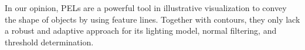 \documentclass[9pt,fleqn,twoside,twocolumn]{stdglobal}
\begin{document}
  In our opinion, PELs are a powerful tool in illustrative visualization to convey the shape of objects by using feature lines.
  Together with contours, they only lack a robust and adaptive approach for its lighting model, normal filtering, and threshold determination.

\nocite{*}
\AtNextBibliography{\small}
\printbibliography[heading=bibintoc]

\appendix
\end{document}
